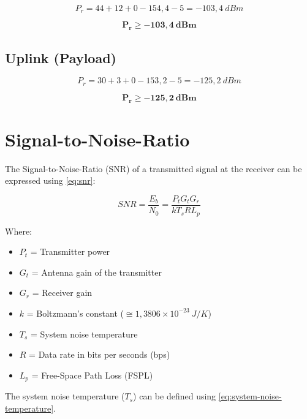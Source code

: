 \begin{equation}
    P_{r} = 44 + 12 + 0 - 154,4 - 5 = -103,4\ dBm
\end{equation}

\begin{equation}
    \mathbf{P_{r} \geq -103,4\ dBm}
\end{equation}

\subsection{Uplink (Payload)}

\begin{equation}
    P_{r} = 30 + 3 + 0 - 153,2 - 5 = -125,2\ dBm
\end{equation}

\begin{equation}
    \mathbf{P_{r} \geq -125,2\ dBm}
\end{equation}

\section{Signal-to-Noise-Ratio}

The Signal-to-Noise-Ratio (SNR) of a transmitted signal at the receiver can be expressed using \autoref{eq:snr}:

\begin{equation} \label{eq:snr}
    SNR = \frac{E_{b}}{N_{0}} = \frac{P_{t}G_{t}G_{r}}{kT_{s}RL_{p}}
\end{equation}

Where:

\begin{itemize}
    \item $P_{t}$ = Transmitter power
    \item $G_{t}$ = Antenna gain of the transmitter
    \item $G_{r}$ = Receiver gain
    \item $k$ = Boltzmann's constant ($\cong 1,3806 \times 10^{-23}\ J/K$)
    \item $T_{s}$ = System noise temperature
    \item $R$ = Data rate in bits per seconds (bps)
    \item $L_{p}$ = Free-Space Path Loss (FSPL)
\end{itemize}

The system noise temperature ($T_{s}$) can be defined using \autoref{eq:system-noise-temperature}.

